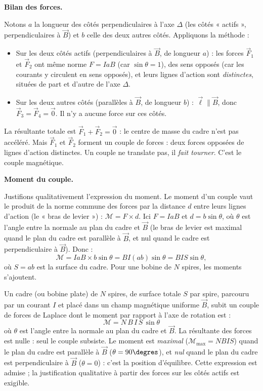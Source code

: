 \documentclass[11pt]{article}
\newcommand{\cle}[1]{{\popxbold\color{popdark}#1}}
\begin{document}
\textbf{Bilan des forces.}\par
Notons $a$ la longueur des côtés perpendiculaires à l'axe $\Delta$ (les côtés « actifs », perpendiculaires à $\vec{B}$) et $b$ celle des deux autres côtés. Appliquons la méthode :
\begin{itemize}
\item Sur les deux côtés actifs (perpendiculaires à $\vec{B}$, de longueur $a$) : les forces $\vec{F}_1$ et $\vec{F}_2$ ont même norme $F = I a B$ (car $\sin\theta = 1$), des sens opposés (car les courants y circulent en sens opposés), et leurs lignes d'action sont \emph{distinctes}, situées de part et d'autre de l'axe $\Delta$.
\item Sur les deux autres côtés (parallèles à $\vec{B}$, de longueur $b$) : $\vec{\ell} \parallel \vec{B}$, donc $\vec{F}_3 = \vec{F}_4 = \vec{0}$. Il n'y a aucune force sur ces côtés.
\end{itemize}
La résultante totale est $\vec{F}_1 + \vec{F}_2 = \vec{0}$ : le centre de masse du cadre n'est pas accéléré. Mais $\vec{F}_1$ et $\vec{F}_2$ forment un \cle{couple de forces} : deux forces opposées de lignes d'action distinctes. Un couple ne translate pas, il \emph{fait tourner}. C'est le \cle{couple magnétique}.

\textbf{Moment du couple.}\par
Justifions qualitativement l'expression du moment. Le moment d'un couple vaut le produit de la norme commune des forces par la distance $d$ entre leurs lignes d'action (le « bras de levier ») : $\mathcal{M} = F \times d$. Ici $F = I a B$ et $d = b\sin\theta$, où $\theta$ est l'angle entre la normale au plan du cadre et $\vec{B}$ (le bras de levier est maximal quand le plan du cadre est parallèle à $\vec{B}$, et nul quand le cadre est perpendiculaire à $\vec{B}$). Donc :
\[ \mathcal{M} = I a B \times b \sin\theta = B I (a b) \sin\theta = B I S \sin\theta, \]
où $S = ab$ est la surface du cadre. Pour une bobine de $N$ spires, les moments s'ajoutent.

\begin{propriete}
Un cadre (ou bobine plate) de $N$ spires, de surface totale $S$ par spire, parcouru par un courant $I$ et placé dans un champ magnétique uniforme $\vec{B}$, subit un couple de forces de Laplace dont le moment par rapport à l'axe de rotation est :
\[ \mathcal{M} = N\,B\,I\,S\,\sin\theta \]
où $\theta$ est l'angle entre la normale au plan du cadre et $\vec{B}$. La résultante des forces est nulle : seul le couple subsiste. Le moment est \emph{maximal} ($\mathcal{M}_{\max} = NBIS$) quand le plan du cadre est parallèle à $\vec{B}$ ($\theta = 90\degres$), et \emph{nul} quand le plan du cadre est perpendiculaire à $\vec{B}$ ($\theta = 0$) : c'est la position d'équilibre. Cette expression est admise ; la justification qualitative à partir des forces sur les côtés actifs est exigible.
\end{propriete}
\end{document}
